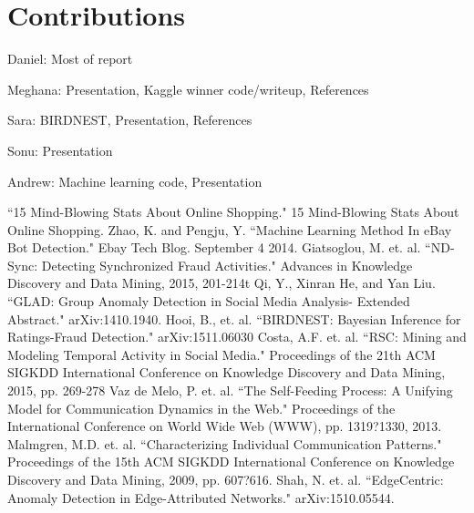 \documentclass{article} %
\begin{document}
\section{Contributions}

Daniel: Most of report

Meghana: Presentation, Kaggle winner code/writeup, References

Sara: BIRDNEST, Presentation, References

Sonu: Presentation

Andrew: Machine learning code, Presentation

\begin{thebibliography}{123}

 ``15 Mind-Blowing Stats About Online Shopping." 15 Mind-Blowing Stats About Online Shopping.
 Zhao, K. and Pengju, Y. ``Machine Learning Method In eBay Bot Detection." Ebay Tech Blog. September 4 2014.
 Giatsoglou, M. et. al. ``ND-Sync: Detecting Synchronized Fraud Activities." Advances in Knowledge Discovery and Data Mining, 2015, 201-214t
 Qi, Y., Xinran He, and Yan Liu. ``GLAD: Group Anomaly Detection in Social Media Analysis- Extended Abstract." arXiv:1410.1940.
 Hooi, B., et. al. ``BIRDNEST: Bayesian Inference for Ratings-Fraud Detection." arXiv:1511.06030
 Costa, A.F. et. al. ``RSC: Mining and Modeling Temporal Activity in Social Media." Proceedings of the 21th ACM SIGKDD International Conference on Knowledge Discovery and Data Mining, 2015, pp. 269-278
 Vaz de Melo, P. et. al. ``The Self-Feeding Process: A Unifying Model for Communication Dynamics in the Web." Proceedings of the International Conference on World Wide Web (WWW), pp. 1319?1330, 2013.
 Malmgren, M.D. et. al. ``Characterizing Individual Communication Patterns." Proceedings of the 15th ACM SIGKDD International Conference on Knowledge Discovery and Data Mining, 2009, pp. 607?616.
 Shah, N. et. al. ``EdgeCentric: Anomaly Detection in Edge-Attributed Networks." arXiv:1510.05544.

\end{thebibliography}
\end{document}
